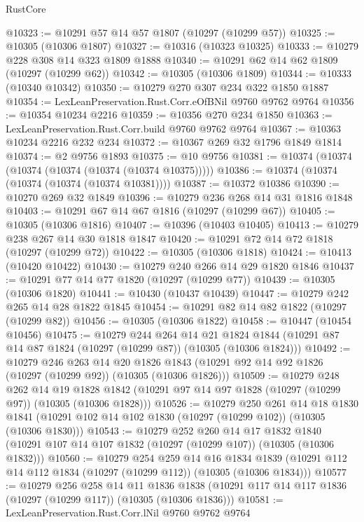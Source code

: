 \begin{lexlean}{RustCore}
\begin{coremodule}
@10323 := @10291 @57 @14 @57 @1807 (@10297 (@10299 @57))
@10325 := @10305 (@10306 @1807)
@10327 := @10316 (@10323 @10325)
@10333 := @10279 @228 @308 @14 @323 @1809 @1888
@10340 := @10291 @62 @14 @62 @1809 (@10297 (@10299 @62))
@10342 := @10305 (@10306 @1809)
@10344 := @10333 (@10340 @10342)
@10350 := @10279 @270 @307 @234 @322 @1850 @1887
@10354 := LexLeanPreservation.Rust.Corr.eOfBNil @9760 @9762 @9764
@10356 := @10354 @10234 @2216
@10359 := @10356 @270 @234 @1850
@10363 := LexLeanPreservation.Rust.Corr.build @9760 @9762 @9764
@10367 := @10363 @10234 @2216 @232 @234
@10372 := @10367 @269 @32 @1796 @1849 @1814
@10374 := @2 @9756 @1893
@10375 := @10 @9756
@10381 := @10374 (@10374 (@10374 (@10374 (@10374 (@10374 @10375)))))
@10386 := @10374 (@10374 (@10374 (@10374 (@10374 @10381))))
@10387 := @10372 @10386
@10390 := @10270 @269 @32 @1849
@10396 := @10279 @236 @268 @14 @31 @1816 @1848
@10403 := @10291 @67 @14 @67 @1816 (@10297 (@10299 @67))
@10405 := @10305 (@10306 @1816)
@10407 := @10396 (@10403 @10405)
@10413 := @10279 @238 @267 @14 @30 @1818 @1847
@10420 := @10291 @72 @14 @72 @1818 (@10297 (@10299 @72))
@10422 := @10305 (@10306 @1818)
@10424 := @10413 (@10420 @10422)
@10430 := @10279 @240 @266 @14 @29 @1820 @1846
@10437 := @10291 @77 @14 @77 @1820 (@10297 (@10299 @77))
@10439 := @10305 (@10306 @1820)
@10441 := @10430 (@10437 @10439)
@10447 := @10279 @242 @265 @14 @28 @1822 @1845
@10454 := @10291 @82 @14 @82 @1822 (@10297 (@10299 @82))
@10456 := @10305 (@10306 @1822)
@10458 := @10447 (@10454 @10456)
@10475 := @10279
    @244
    @264
    @14
    @21
    @1824
    @1844
    (@10291 @87 @14 @87 @1824 (@10297 (@10299 @87)) (@10305 (@10306 @1824)))
@10492 := @10279
    @246
    @263
    @14
    @20
    @1826
    @1843
    (@10291 @92 @14 @92 @1826 (@10297 (@10299 @92)) (@10305 (@10306 @1826)))
@10509 := @10279
    @248
    @262
    @14
    @19
    @1828
    @1842
    (@10291 @97 @14 @97 @1828 (@10297 (@10299 @97)) (@10305 (@10306 @1828)))
@10526 := @10279
    @250
    @261
    @14
    @18
    @1830
    @1841
    (@10291 @102 @14 @102 @1830 (@10297 (@10299 @102)) (@10305 (@10306 @1830)))
@10543 := @10279
    @252
    @260
    @14
    @17
    @1832
    @1840
    (@10291 @107 @14 @107 @1832 (@10297 (@10299 @107)) (@10305 (@10306 @1832)))
@10560 := @10279
    @254
    @259
    @14
    @16
    @1834
    @1839
    (@10291 @112 @14 @112 @1834 (@10297 (@10299 @112)) (@10305 (@10306 @1834)))
@10577 := @10279
    @256
    @258
    @14
    @11
    @1836
    @1838
    (@10291 @117 @14 @117 @1836 (@10297 (@10299 @117)) (@10305 (@10306 @1836)))
@10581 := LexLeanPreservation.Rust.Corr.lNil @9760 @9762 @9764

\end{coremodule}
\end{lexlean}
